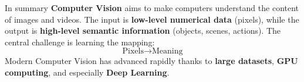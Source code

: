 \highspace
In summary \textbf{Computer Vision} aims to make computers understand the content of images and videos. The input is \textbf{low-level numerical data} (pixels), while the output is \textbf{high-level semantic information} (objects, scenes, actions). The central challenge is learning the mapping:
\begin{equation*}
    \text{Pixels} \to \text{Meaning}
\end{equation*}
Modern Computer Vision has advanced rapidly thanks to \textbf{large datasets}, \textbf{GPU computing}, and especially \textbf{Deep Learning}.